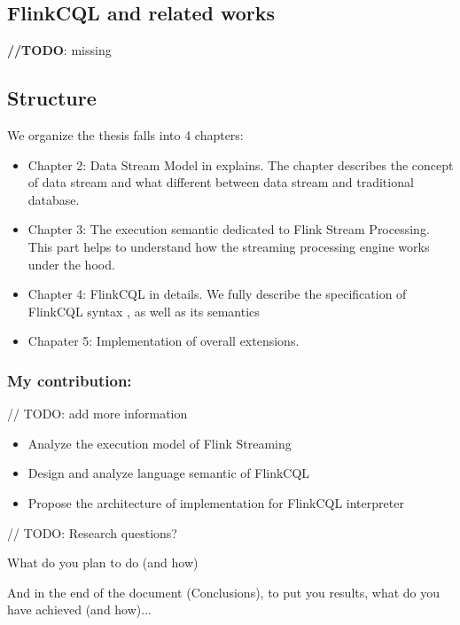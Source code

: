 \subsection*{FlinkCQL and related works}
\textbf{//TODO}: missing

\subsection*{Structure}
We organize the thesis falls into 4 chapters:
\begin{itemize}
	\item Chapter 2: Data Stream Model in explains. The chapter describes the concept of data stream and what different between data stream and traditional database. 
	\item Chapter 3: The execution semantic dedicated to Flink Stream Processing. This part helps to understand how the streaming processing engine works under the hood.
	\item Chapter 4: FlinkCQL in details. We fully describe the specification of FlinkCQL syntax , as well as its semantics
	\item Chapater 5: Implementation of overall extensions.
\end{itemize}


\subsubsection*{My contribution:}
// TODO: add more information
\begin{itemize}
	\item Analyze the execution model of Flink Streaming
	\item Design and analyze language semantic of FlinkCQL
	\item Propose the architecture of implementation for FlinkCQL interpreter
\end{itemize}


// TODO:
Research questions?

What do you plan to do (and how)

And in the end of the document (Conclusions), to put you results, what do you have achieved (and how)...









 
 
 

